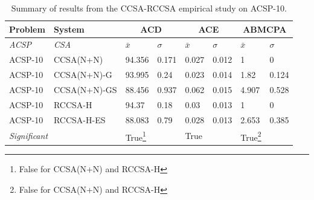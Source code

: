 \begin{table}[htp]
	\centering\small
		\begin{minipage}{0.80\textwidth}		
		  \centering
			\begin{tabular}{llllllll}			
			\toprule
			\textbf{Problem} & \textbf{System} & \multicolumn{2}{c}{\textbf{ACD}} & \multicolumn{2}{c}{\textbf{ACE}} & \multicolumn{2}{c}{\textbf{ABMCPA}}\\
			\midrule
			\emph{ACSP} & \emph{CSA} & $\bar{x}$ & $\sigma$ & $\bar{x}$ & $\sigma$ & $\bar{x}$ & $\sigma$\\
			\toprule
			ACSP-10 & CCSA(N+N) & 94.356 & 0.171 & 0.027 & 0.012 & 1 & 0 \\
			ACSP-10 & CCSA(N+N)-G & 93.995 & 0.24 & 0.023 & 0.014 & 1.82 & 0.124 \\
			ACSP-10 & CCSA(N+N)-GS & 88.456 & 0.937 & 0.062 & 0.015 & 4.907 & 0.528 \\
			ACSP-10 & RCCSA-H & 94.37 & 0.18 & 0.03 & 0.013 & 1 & 0 \\
			ACSP-10 & RCCSA-H-ES & 88.083 & 0.79 & 0.028 & 0.013 & 2.653 & 0.385 \\
			\multicolumn{2}{l}{\emph{Significant}} & True\footnote{False for CCSA(N+N) and RCCSA-H} &  & True &  & True\footnote{False for CCSA(N+N) and RCCSA-H} & \\
			\bottomrule
			\end{tabular}			
		\end{minipage}
	\caption{Summary of results from the CCSA-RCCSA empirical study on ACSP-10.}
	\label{tab:cells:ccsa:rccsa}
\end{table}

